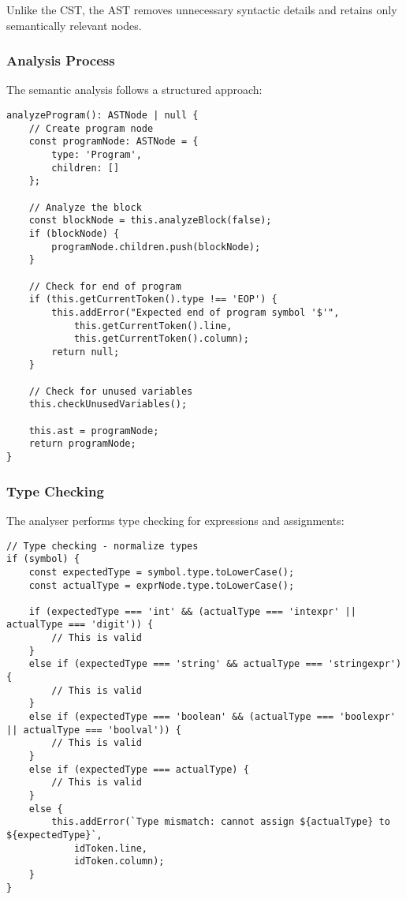 \documentclass[12pt]{article}
\begin{document}
Unlike the CST, the AST removes unnecessary syntactic details and retains only semantically relevant nodes.

\subsubsection{Analysis Process}
The semantic analysis follows a structured approach:

\begin{lstlisting}
analyzeProgram(): ASTNode | null {
    // Create program node
    const programNode: ASTNode = {
        type: 'Program',
        children: []
    };

    // Analyze the block
    const blockNode = this.analyzeBlock(false);
    if (blockNode) {
        programNode.children.push(blockNode);
    }

    // Check for end of program
    if (this.getCurrentToken().type !== 'EOP') {
        this.addError("Expected end of program symbol '$'", 
            this.getCurrentToken().line, 
            this.getCurrentToken().column);
        return null;
    }

    // Check for unused variables
    this.checkUnusedVariables();

    this.ast = programNode;
    return programNode;
}
\end{lstlisting}

\subsubsection{Type Checking}
The analyser performs type checking for expressions and assignments:

\begin{lstlisting}
// Type checking - normalize types
if (symbol) {
    const expectedType = symbol.type.toLowerCase();
    const actualType = exprNode.type.toLowerCase();
    
    if (expectedType === 'int' && (actualType === 'intexpr' || actualType === 'digit')) {
        // This is valid
    }
    else if (expectedType === 'string' && actualType === 'stringexpr') {
        // This is valid
    }
    else if (expectedType === 'boolean' && (actualType === 'boolexpr' || actualType === 'boolval')) {
        // This is valid
    }
    else if (expectedType === actualType) {
        // This is valid
    }
    else {
        this.addError(`Type mismatch: cannot assign ${actualType} to ${expectedType}`, 
            idToken.line, 
            idToken.column);
    }
}
\end{lstlisting}
\end{document}
